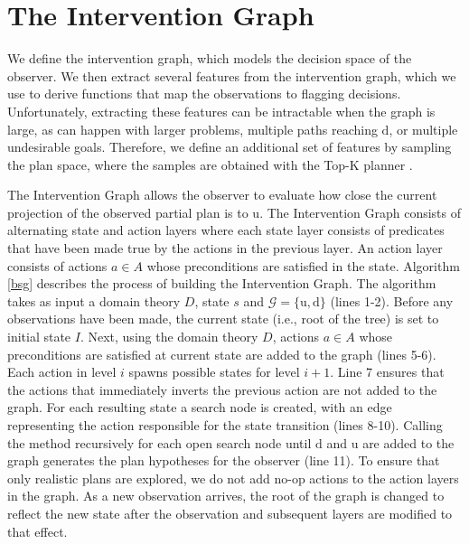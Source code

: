 \documentclass[letterpaper]{article}
\theoremstyle{plain}
\begin{document}
\section{The Intervention Graph}
\label{sec:stategraph}
We define the intervention graph, which models the decision space of the observer.
We then extract several features from the  intervention graph, which we use to derive functions that map the observations to flagging decisions.
Unfortunately, extracting these features can be intractable when the graph is large, as can happen with larger problems, multiple paths reaching $\mathrm{d}$, or multiple undesirable goals. Therefore, we define an additional set of features by sampling the plan space, where the samples are obtained with the Top-K planner \cite{riabov2014}.

The Intervention Graph allows the observer to evaluate how close the current projection of the observed partial plan is to $\mathrm{u}$. The Intervention Graph consists of alternating state and action layers where each state layer consists of predicates that have been made true by the actions in the previous layer. An action layer consists of actions $a\in A$ whose preconditions are satisfied in the state. Algorithm \ref{bsg} describes the process of building the Intervention Graph. The algorithm takes as input a domain theory $D$, state $s$ and $\mathcal{G}=\lbrace\mathrm{u},\mathrm{d}\rbrace$ (lines 1-2). Before any observations have been made, the current state (i.e., root of the tree) is set to initial state $I$. Next, using the domain theory $D$, actions  $a\in A$ whose preconditions are satisfied at current state are added to the graph (lines 5-6). Each action in level $i$ spawns possible states for level $i+1$. Line 7 ensures that the actions that immediately inverts the previous action are not added to the graph. For each resulting state a search node is created, with an edge representing the action responsible for the state transition (lines 8-10). Calling the method recursively for each open search node until $\mathrm{d}$ and $\mathrm{u}$ are added to the graph generates the plan hypotheses for the observer (line 11). To ensure that only realistic plans are explored, we do not add no-op actions to the action layers in the graph. As a new observation arrives, the root of the graph is changed to reflect the new state after the observation and subsequent layers are  modified to that effect.  
\end{document}
